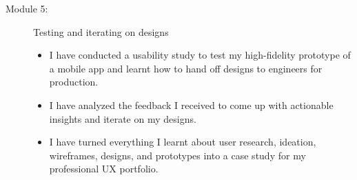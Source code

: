 \begin{flushleft}
\begin{description}
\begin{itemize}
		      \end{itemize}
		\item[Module 5:] Testing and iterating on designs
		      \begin{itemize}
			      \item I have conducted a usability study to test my high-fidelity prototype of a mobile app and learnt how to hand off designs to engineers for production.
			      \item I have analyzed the feedback I received to come up with actionable insights and iterate on my designs.
			      \item I have turned everything I learnt about user research, ideation, wireframes, designs, and prototypes into a case study for my professional UX portfolio.
		      \end{itemize}
	\end{description}
\end{flushleft}